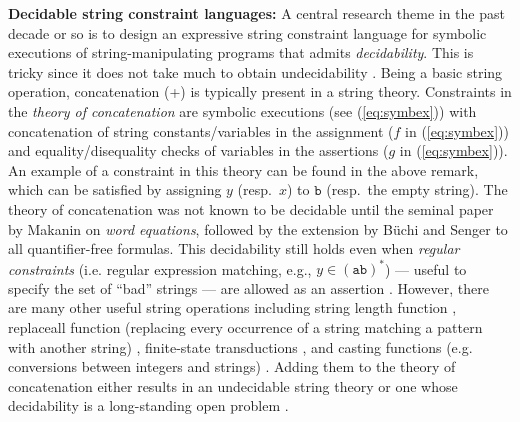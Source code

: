 \smallskip
\noindent
\textbf{Decidable string constraint languages:}
A central research theme in the past decade or so is to design an
expressive string constraint language for symbolic executions of 
string-manipulating
programs that admits \emph{decidability}. This 
is tricky since it does not take much to obtain undecidability
\cite{BTV09}. 
Being a basic string operation,
concatenation (+) is typically present in a string theory.
Constraints in the \emph{theory of concatenation} 
are symbolic executions (see (\ref{eq:symbex}))
with concatenation of string constants/variables in the
assignment ($f$ in (\ref{eq:symbex})) and equality/disequality checks of
variables in the assertions ($g$ in (\ref{eq:symbex})).
An example of a constraint in this theory can be found in the above remark, 
which can be satisfied by
assigning $y$ (resp.~$x$) to $\texttt{b}$ (resp.~the empty string). 
The theory of concatenation was 
not known to be decidable until the seminal
paper by Makanin \cite{Makanin} on \emph{word equations}, followed by the
extension by B\"{u}chi and Senger \cite{buchi} to all quantifier-free formulas.
This decidability still holds even when
\emph{regular constraints} (i.e. regular expression matching, e.g., 
$y \in (\texttt{ab})^*$) --- useful to specify the set of ``bad'' strings ---
are allowed as an assertion \cite{Schulz}. 
However, there are many other useful string 
operations including string length function
\cite{Vijay-length,Berkeley-JavaScript}, replaceall
function (replacing every occurrence of a string matching a pattern with another
string) \cite{CCHLW18,fang-yu-circuits,YABI14,Stranger,S3,TCJ16}, 
finite-state transductions \cite{LB16,BEK,web-model,DV13}, and casting 
functions (e.g. conversions
between integers and strings) \cite{GB16}. Adding them to the theory of 
concatenation
either results in an undecidable string theory \cite{LB16,BFL13,GB16}
or one whose decidability is a long-standing open problem \cite{Vijay-length}.

